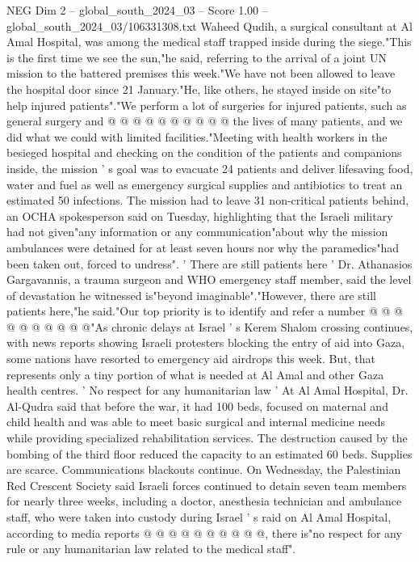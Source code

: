 \begin{textsample}{NEG Dim 2 – global\_south\_2024\_03 – Score 1.00 – global\_south\_2024\_03/106331308.txt}
Waheed Qudih, a surgical consultant at Al Amal Hospital, was among the medical staff trapped inside during the siege."This is the first time we see the sun,"he said, referring to the arrival of a joint UN mission to the battered premises this week."We have not been allowed to leave the hospital door since 21 January."He, like others, he stayed inside on site"to help injured patients"."We perform a lot of surgeries for injured patients, such as general surgery and @ @ @ @ @ @ @ @ @ @ the lives of many patients, and we did what we could with limited facilities."Meeting with health workers in the besieged hospital and checking on the condition of the patients and companions inside, the mission ' s goal was to evacuate 24 patients and deliver lifesaving food, water and fuel as well as emergency surgical supplies and antibiotics to treat an estimated 50 infections.
The mission had to leave 31 non-critical patients behind, an OCHA spokesperson said on Tuesday, highlighting that the Israeli military had not given"any information or any communication"about why the mission ambulances were detained for at least seven hours nor why the paramedics"had been taken out, forced to undress". ' There are still patients here ' Dr.
Athanasios Gargavannis, a trauma surgeon and WHO emergency staff member, said the level of devastation he witnessed is"beyond imaginable"."However, there are still patients here,"he said."Our top priority is to identify and refer a number @ @ @ @ @ @ @ @ @ @"As chronic delays at Israel ' s Kerem Shalom crossing continues, with news reports showing Israeli protesters blocking the entry of aid into Gaza, some nations have resorted to emergency aid airdrops this week.
But, that represents only a tiny portion of what is needed at Al Amal and other Gaza health centres. ' No respect for any humanitarian law ' At Al Amal Hospital, Dr.
Al-Qudra said that before the war, it had 100 beds, focused on maternal and child health and was able to meet basic surgical and internal medicine needs while providing specialized rehabilitation services.
The destruction caused by the bombing of the third floor reduced the capacity to an estimated 60 beds.
Supplies are scarce.
Communications blackouts continue.
On Wednesday, the Palestinian Red Crescent Society said Israeli forces continued to detain seven team members for nearly three weeks, including a doctor, anesthesia technician and ambulance staff, who were taken into custody during Israel ' s raid on Al Amal Hospital, according to media reports @ @ @ @ @ @ @ @ @ @, there is"no respect for any rule or any humanitarian law related to the medical staff".

\end{textsample}
